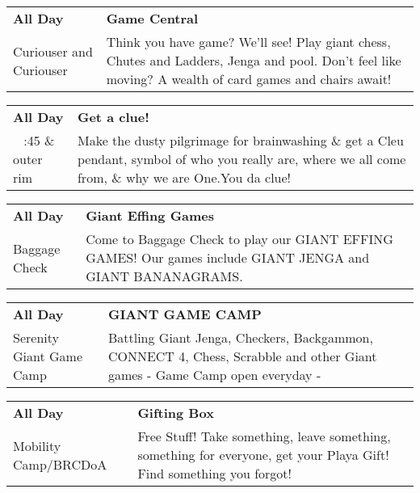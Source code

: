 \begin{tabular}{ p{1in} p{2.2in} }
    \textbf{All Day} & \textbf{Game Central} \\
    Curiouser and Curiouser \newline  & Think you have game? We'll see! Play giant chess, Chutes and Ladders, Jenga and pool. Don't feel like moving? A wealth of card games and chairs await! \\
    \hline 
\end{tabular}
    
\begin{tabular}{ p{1in} p{2.2in} }
    \textbf{All Day} & \textbf{Get a clue!} \\
    ~ \newline 3:45 \& outer rim & Make the dusty pilgrimage for brainwashing \& get a Cleu pendant, symbol of who you really are, where we all come from, \& why we are One.You da clue! \\
    \hline 
\end{tabular}
    
\begin{tabular}{ p{1in} p{2.2in} }
    \textbf{All Day} & \textbf{Giant Effing Games} \\
    Baggage Check \newline  & Come to Baggage Check to play our GIANT EFFING GAMES! Our games include GIANT JENGA and GIANT BANANAGRAMS. \\
    \hline 
\end{tabular}
    
\begin{tabular}{ p{1in} p{2.2in} }
    \textbf{All Day} & \textbf{GIANT GAME CAMP} \\
    Serenity Giant Game Camp \newline  & Battling Giant Jenga, Checkers, Backgammon, CONNECT 4, Chess, Scrabble and other Giant games - Game Camp open everyday - \\
    \hline 
\end{tabular}
    
\begin{tabular}{ p{1in} p{2.2in} }
    \textbf{All Day} & \textbf{Gifting Box} \\
    Mobility Camp/BRCDoA \newline  & Free Stuff! Take something, leave something, something for everyone, get your Playa Gift! Find something you forgot! \\
    \hline 
\end{tabular}
    

